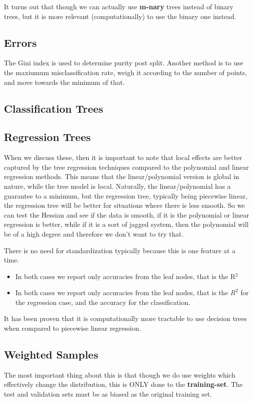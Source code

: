 \documentclass[12pt,a4paper,oneside,headinclude]{scrartcl}
\numberwithin{figure}{section}
\numberwithin{equation}{section}
\numberwithin{table}{section}
\begin{document}
It turns out that though we can actually use \textbf{m-nary} trees instead of binary
trees, but it is more relevant (computationally) to use the binary one instead.

\subsection{Errors}
\label{sec:org043fdb6}
The Gini index is used to determine purity post split. Another method is to use
the maxiumum misclassification rate, weigh it according to the number of points, and
move towards the minimum of that.

\subsection{Classification Trees}
\label{sec:org05071ea}
\subsection{Regression Trees}
\label{sec:org17d8a07}
When we discuss these, then it is important to note that local effects are
better captured by the tree regression techniques compared to the polynomial and
linear regression methods. This means that the linear/polynomial version is
global in nature, while the tree model is local. Naturally, the
linear/polynomial has a guarantee to a minimum, but the regression tree,
typically being piecewise linear, the regression tree will be better for
situations where there is less smooth. So we can test the Hessian and see if the
data is smooth, if it is the polynomial or linear regression is better, while if
it is a sort of jagged system, then the polynomial will be of a high degree and
therefore we don't want to try that.

There is no need for standardization typically because this is one feature
at a time.

\begin{itemize}
\item In both cases we report only accuracies from the leaf nodes, that is the R\(^{\text{2}}\)
\item In both cases we report only accuracies from the leaf nodes, that is the \(R^2\)
for the regression case, and the accuracy for the classification.
\end{itemize}

It has been proven that it is computationally more tractable to use decision
trees when compared to piecewise linear regression.
\subsection{Weighted Samples}
\label{sec:orgad05e15}
The most important thing about this is that though we do use weights which
effectively change the distribution, this is ONLY done to the \textbf{training-set}.
The test and validation sets must be as biased as the original training set.
\end{document}
